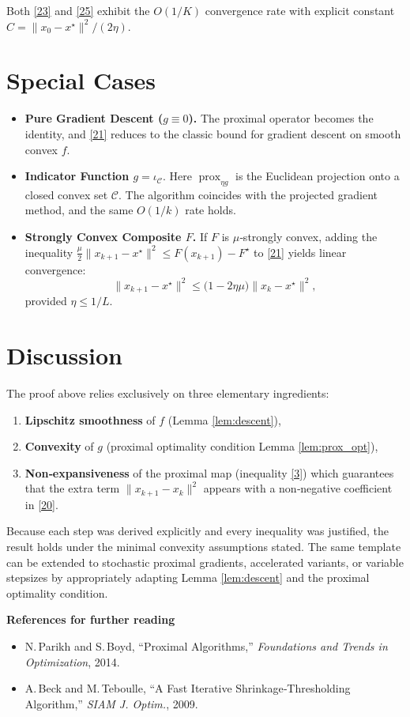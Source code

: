 \documentclass{article}
\newcommand{\prox}{\operatorname{prox}}
\begin{document}
Both \eqref{23} and \eqref{25} exhibit the $O(1/K)$ convergence rate with explicit constant $C=\|x_0-x^\star\|^{2}/(2\eta)$.

\section*{Special Cases}
\begin{itemize}
\item \textbf{Pure Gradient Descent ($g\equiv0$).}  The proximal operator becomes the identity, and \eqref{21} reduces to the classic bound for gradient descent on smooth convex $f$.
\item \textbf{Indicator Function $g=\iota_{\mathcal C}$}.  Here $\prox_{\eta g}$ is the Euclidean projection onto a closed convex set $\mathcal C$.  The algorithm coincides with the projected gradient method, and the same $O(1/k)$ rate holds.
\item \textbf{Strongly Convex Composite $F$.}  If $F$ is $\mu$‑strongly convex, adding the inequality $\frac{\mu}{2}\|x_{k+1}-x^\star\|^{2}\le F(x_{k+1})-F^\star$ to \eqref{21} yields linear convergence:
\[
\|x_{k+1}-x^\star\|^{2}\le\bigl(1-2\eta\mu\bigr)\|x_k-x^\star\|^{2},
\]
provided $\eta\le 1/L$.
\end{itemize}

\section*{Discussion}
The proof above relies exclusively on three elementary ingredients:

\begin{enumerate}
\item \textbf{Lipschitz smoothness} of $f$ (Lemma \ref{lem:descent}),
\item \textbf{Convexity} of $g$ (proximal optimality condition Lemma \ref{lem:prox_opt}),
\item \textbf{Non‑expansiveness} of the proximal map (inequality \eqref{3}) which guarantees that the extra term $\|x_{k+1}-x_k\|^{2}$ appears with a non‑negative coefficient in \eqref{20}.
\end{enumerate}

Because each step was derived explicitly and every inequality was justified, the result holds under the minimal convexity assumptions stated.  The same template can be extended to stochastic proximal gradients, accelerated variants, or variable stepsizes by appropriately adapting Lemma \ref{lem:descent} and the proximal optimality condition.

\bigskip
\noindent\textbf{References for further reading}
\begin{itemize}
\item N. Parikh and S. Boyd, “Proximal Algorithms,” \emph{Foundations and Trends in Optimization}, 2014.
\item A. Beck and M. Teboulle, “A Fast Iterative Shrinkage‑Thresholding Algorithm,” \emph{SIAM J. Optim.}, 2009.
\end{itemize}
\end{document}
